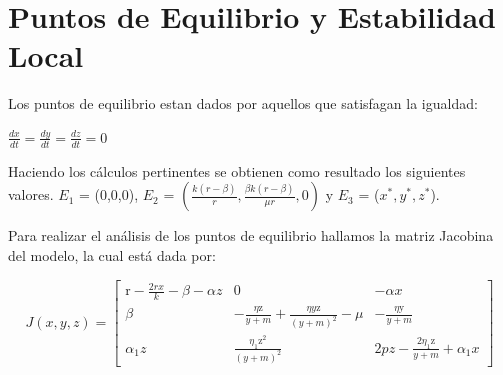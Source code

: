 \documentclass{wscpaperproc}
\theoremstyle{wsc}
\begin{document}
\section{Puntos de Equilibrio y Estabilidad Local}
Los puntos de equilibrio estan dados por aquellos que satisfagan la igualdad:
\begin{center}
	$\frac{dx}{dt} = \frac{dy}{dt} = \frac{dz}{dt} = 0$
\end{center}
Haciendo los c\'alculos pertinentes se obtienen como resultado los siguientes valores.
$E_1$ = (0,0,0), $E_2$ = $(\frac{k(r-\beta)}{r}, \frac{\beta k(r-\beta)}{\mu r}, 0)$ y $E_3$ = ($x^*,y^*,z^*$).

Para realizar el análisis de los puntos de equilibrio hallamos la matriz Jacobina del modelo, la cual está dada por:

\begin{equation} \label{JacobianoEstability}
	J\left(x, y, z\right)=\left[\begin{array}{ccc}
			\mathrm{r}-\frac{2 r x}{k}-\beta-\alpha z & 0                                                                  & -\alpha x                                        \\
			\beta                                     & -\frac{\eta \mathrm{z}}{y+m}+\frac{\eta y \mathrm{z}}{(y+m)^2}-\mu & -\frac{\eta \mathrm{y}}{y+m}                     \\
			\alpha_1 z                                & \frac{\eta_1 \mathrm{z}^2}{(y+m)^2}                                & 2 p z-\frac{2 \eta_1 \mathrm{z}}{y+m}+\alpha_1 x
		\end{array}\right]
\end{equation}
\end{document}
